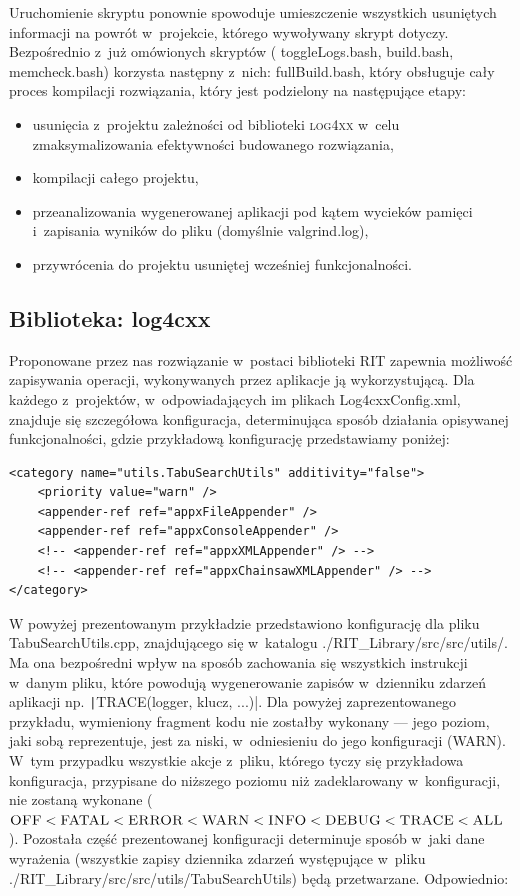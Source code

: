 Uruchomienie skryptu ponownie spowoduje umieszczenie wszystkich usuniętych informacji na powrót w~projekcie, którego wywoływany skrypt dotyczy. Bezpośrednio z~już omówionych skryptów ( \textsf{toggleLogs.bash}, \textsf{build.bash}, \textsf{memcheck.bash}) korzysta następny z~nich: \textsf{fullBuild.bash}, który obsługuje cały proces kompilacji rozwiązania, który jest podzielony na następujące etapy:
\begin{itemize}
	\item usunięcia z~projektu zależności od biblioteki \textsc{log4xx} w~celu zmaksymalizowania efektywności budowanego rozwiązania,
	\item kompilacji całego projektu,
	\item przeanalizowania wygenerowanej aplikacji pod kątem wycieków pamięci i~zapisania wyników do pliku (domyślnie \textsf{valgrind.log}),
	\item przywrócenia do projektu usuniętej wcześniej funkcjonalności.
\end{itemize}

\subsection{Biblioteka: log4cxx}

Proponowane przez nas rozwiązanie w~postaci biblioteki RIT zapewnia możliwość zapisywania operacji, wykonywanych przez aplikacje ją wykorzystującą. Dla każdego z~projektów, w~odpowiadających im plikach Log4cxxConfig.xml, znajduje się szczegółowa konfiguracja, determinująca sposób działania opisywanej funkcjonalności, gdzie przykładową konfigurację przedstawiamy poniżej:

\begin{verbatim}
<category name="utils.TabuSearchUtils" additivity="false">
	<priority value="warn" />
	<appender-ref ref="appxFileAppender" />
	<appender-ref ref="appxConsoleAppender" />
	<!-- <appender-ref ref="appxXMLAppender" /> -->
	<!-- <appender-ref ref="appxChainsawXMLAppender" /> -->
</category>
\end{verbatim}

W powyżej prezentowanym przykładzie przedstawiono konfigurację dla pliku \textsf{TabuSearchUtils.cpp}, znajdującego się w~katalogu \textsf{./RIT\_Library/src/src/utils/}. Ma ona bezpośredni wpływ na sposób zachowania się wszystkich instrukcji w~danym pliku, które powodują wygenerowanie zapisów w~dzienniku zdarzeń aplikacji np. \texttt|TRACE(logger, klucz, ...)|. Dla powyżej zaprezentowanego przykładu, wymieniony fragment kodu nie zostałby wykonany --- jego poziom, jaki sobą reprezentuje, jest za niski, w~odniesieniu do jego konfiguracji (\textsc{WARN}). W~tym przypadku wszystkie akcje z~pliku, którego tyczy się przykładowa konfiguracja, przypisane do niższego poziomu niż zadeklarowany w~konfiguracji, nie zostaną wykonane ($\textsc{OFF} < \textsc{FATAL} < \textsc{ERROR} < \textsc{WARN} < \textsc{INFO} < \textsc{DEBUG} < \textsc{TRACE} < \textsc{ALL}$). Pozostała część prezentowanej konfiguracji determinuje sposób w~jaki dane wyrażenia (wszystkie zapisy dziennika zdarzeń występujące w~pliku \textsf{./RIT\_Library/src/src/utils/TabuSearchUtils}) będą przetwarzane. Odpowiednio:

